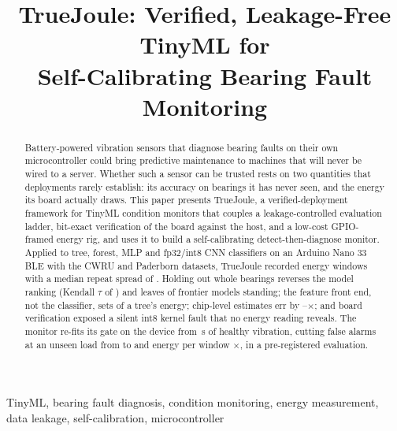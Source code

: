 \documentclass[conference]{IEEEtran}
\newcommand{\TJ}{TrueJoule}
\begin{document}
\title{TrueJoule: Verified, Leakage-Free TinyML for\\Self-Calibrating Bearing Fault Monitoring}

\author{
}

\maketitle

\begin{abstract}
Battery-powered vibration sensors that diagnose bearing faults on their own microcontroller could bring predictive
maintenance to machines that will never be wired to a server. Whether such a sensor can be trusted rests on two
quantities that deployments rarely establish: its accuracy on bearings it has never seen, and the energy its board
actually draws. This paper presents \TJ{}, a verified-deployment framework for TinyML condition monitors that couples
a leakage-controlled evaluation ladder, bit-exact verification of the board against the host, and a low-cost
GPIO-framed energy rig, and uses it to build a self-calibrating detect-then-diagnose monitor. Applied to
\NumCwruNModels{} tree, forest, MLP and fp32/int8 CNN classifiers on an Arduino Nano 33 BLE with the CWRU and
Paderborn datasets, \TJ{} recorded \NumTotWindows{} energy windows with a median repeat spread of \NumCwruCvMed{}.
Holding out whole bearings reverses the model ranking (Kendall $\tau$ of \NumCwruTauPOnePThree{}) and leaves
\NumCwruFrontKept{} of \NumCwruFrontPOneN{} frontier models standing; the feature front end, not the classifier, sets
\NumCwruDTFrontShare{} of a tree's energy; chip-level estimates err by
\NumCwruEstRatioMin--\NumCwruEstRatioMax$\times$; and board verification exposed a silent int8 kernel fault that no
energy reading reveals. The monitor re-fits its gate on the device from \NumCasCalibSixteenS\,s of healthy vibration,
cutting false alarms at an unseen load from \NumCasCwGTwoFpr{} to \NumCasCwGFivenOneSixFpr{} and energy per window
\NumCasCwSaving$\times$, in a pre-registered evaluation.
\end{abstract}

\begin{IEEEkeywords}
TinyML, bearing fault diagnosis, condition monitoring, energy measurement, data leakage, self-calibration,
microcontroller
\end{IEEEkeywords}

\end{document}
